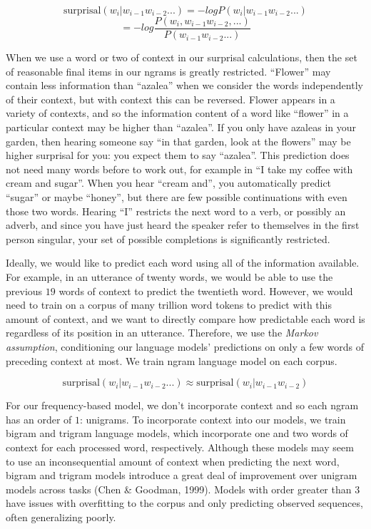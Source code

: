 \documentclass[man,floatsintext]{apa6}
\begin{document}
\[\text{surprisal}(w_i|w_{i-1}w_{i-2}...) = -log P(w_i|w_{i-1}w_{i-2}...)\]
\[= -log \frac{P(w_i,w_{i-1}w_{i-2},...)}{P(w_{i-1}w_{i-2}...)}\]

When we use a word or two of context in our surprisal calculations, then the set of reasonable final items in our ngrams is greatly restricted. \enquote{Flower} may contain less information than \enquote{azalea} when we consider the words independently of their context, but with context this can be reversed. Flower appears in a variety of contexts, and so the information content of a word like \enquote{flower} in a particular context may be higher than \enquote{azalea}. If you only have azaleas in your garden, then hearing someone say \enquote{in that garden, look at the flowers} may be higher surprisal for you: you expect them to say \enquote{azalea}. This prediction does not need many words before to work out, for example in \enquote{I take my coffee with cream and sugar}. When you hear \enquote{cream and}, you automatically predict \enquote{sugar} or maybe \enquote{honey}, but there are few possible continuations with even those two words. Hearing \enquote{I} restricts the next word to a verb, or possibly an adverb, and since you have just heard the speaker refer to themselves in the first person singular, your set of possible completions is significantly restricted.

Ideally, we would like to predict each word using all of the information available. For example, in an utterance of twenty words, we would be able to use the previous \(19\) words of context to predict the twentieth word. However, we would need to train on a corpus of many trillion word tokens to predict with this amount of context, and we want to directly compare how predictable each word is regardless of its position in an utterance. Therefore, we use the \emph{Markov assumption}, conditioning our language models' predictions on only a few words of preceding context at most. We train ngram language model on each corpus.

\[\text{surprisal}(w_i|w_{i-1}w_{i-2}...) \approx \text{surprisal}(w_i|w_{i-1}w_{i-2})\]

For our frequency-based model, we don't incorporate context and so each ngram has an order of \(1\): unigrams. To incorporate context into our models, we train bigram and trigram language models, which incorporate one and two words of context for each processed word, respectively. Although these models may seem to use an inconsequential amount of context when predicting the next word, bigram and trigram models introduce a great deal of improvement over unigram models across tasks (Chen \& Goodman, 1999). Models with order greater than \(3\) have issues with overfitting to the corpus and only predicting observed sequences, often generalizing poorly.
\end{document}
